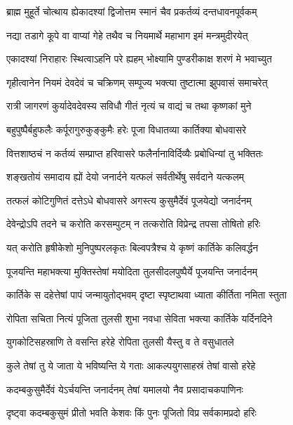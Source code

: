
\twolineshloka
{ब्राह्म मुहूर्ते चोत्थाय ह्येकादश्यां द्विजोत्तम}
{स्मानं चैव प्रकर्तव्यं दन्तधावनपूर्वकम्} %

\twolineshloka
{नद्या तडागे कूपे वा वाप्यां गेहे तथैव च}
{नियमार्थे महाभाग इमं मन्त्रमुदीरयेत्} %

\twolineshloka
{एकादश्यां निराहारः स्थित्वाऽहनि परे ह्यहम्}
{भोक्ष्यामि पुण्डरीकाक्ष शरणं मे भवाच्युत} %

\twolineshloka
{गृहीत्वानेन नियमं देवदेवं च चक्रिणम्}
{सम्पूज्य भक्त्या तुष्टात्मा झुपवासं समाचरेत्} %

\twolineshloka
{रात्री जागरणं कुर्यादेवदेवस्य सविधौ}
{गीतं नृत्यं च वाद्यं च तथा कृष्णकां मुने} %

\twolineshloka
{बहुपुष्पैर्बहुफलैः कर्पूरागुरुकुङ्कुमैः}
{हरेः पूजा विधातव्या कार्तिक्या बोधवासरे} %

\twolineshloka
{वित्तशाष्ठचं न कर्तव्यं सम्प्राप्त हरिवासरे}
{फलैर्नानाविर्दिव्यैः प्रबोधिन्यां तु भक्तितः} %

\twolineshloka
{शङ्खतोयं समादाय ह्यों देयो जनार्दने}
{यत्फलं सर्वतीर्थेषु सर्वदाने यत्कलम्} %

\twolineshloka
{तत्फलं कोटिगुणितं दत्तेऽधे बोधवासरे}
{अगस्त्य कुसुमैर्देवं पूजयेद्यो जनार्दनम्} %

\twolineshloka
{देवेन्द्रोऽपि तदने च करोति करसम्पुटम्}
{न तत्करोति विप्रेन्द्र तपसा तोषितो हरिः} %

\twolineshloka
{यत् करोति हृषीकेशो मुनिपुष्परलकृतः}
{बिल्वपत्रैश्च ये कृष्णं कार्तिके कलिवर्द्धन} %

\twolineshloka
{पूजयन्ति महाभक्त्या मुक्तिस्तेषां मयोदिता}
{तुलसीदलपुष्पैर्ये पूजयन्ति जनार्दनम्} %

\twolineshloka
{कार्तिके स दहेत्तेषां पापं जन्मायुतोद्भवम्}
{दृष्टा स्पृष्टाथवा ध्याता कीर्तिता नमिता स्तुता} %

\twolineshloka
{रोपिता सचिता नित्यं पूजिता तुलसी शुभा}
{नवधा सेविता भक्त्या कार्तिके यर्दिनदिने} %

\twolineshloka
{युगकोटिसहस्राणि ते वसन्ति हरेहे}
{रोपिता तुलसी यैस्तु व ते वसुधातले} %

\twolineshloka
{कुले तेषां तु ये जाता ये भविष्यन्ति ये गताः}
{आकल्पयुगसाहस्रं तेषां वासो हरेहे} %

\twolineshloka
{कदम्बकुसुमैर्देवं येऽर्चयन्ति जनार्दनम्}
{तेषां यमालयो नैव प्रसादाचकपाणिनः} %

\twolineshloka
{दृष्ट्वा कदम्बकुसुमं प्रीतो भवति केशवः}
{किं पुनः पूजितो विप्र सर्वकामप्रदो हरिः} %

